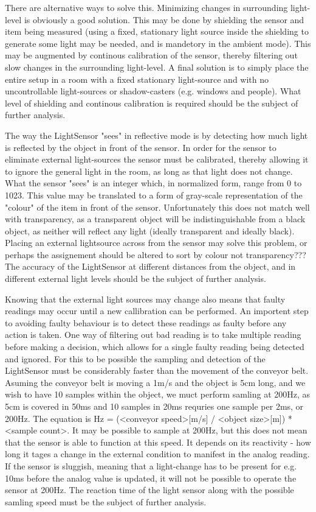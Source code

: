 There are alternative ways to solve this. Minimizing changes in surrounding light-level is obviously a good solution. This may be done by shielding the sensor and item being measured (using a fixed, stationary light source inside the shielding to generate some light may be needed, and is mandetory in the ambient mode). This may be augmented by continous calibration of the sensor, thereby filtering out slow changes in the surrounding light-level. A final solution is to simply place the entire setup in a room with a fixed stationary light-source and with no uncontrollable light-sources or shadow-casters (e.g. windows and people). What level of shielding and continous calibration is required should be the subject of further analysis.

The way the LightSensor "sees" in reflective mode is by detecting how much light is reflected by the object in front of the sensor. In order for the sensor to eliminate external light-sources the sensor must be calibrated, thereby allowing it to ignore the general light in the room, as long as that light does not change. What the sensor "sees" is an integer which, in normalized form, range from 0 to 1023. This value may be translated to a form of gray-scale representation of the "colour" of the item in front of the sensor. Unfortunately this does not match well with transparency, as a transparent object will be indistinguishable from a black object, as neither will reflect any light (ideally transparent and ideally black). Placing an external lightsource across from the sensor may solve this problem, or perhaps the assignement should be altered to sort by colour not transparency??? The accuracy of the LightSensor at different distances from the object, and in different external light levels should be the subject of further analysis.

Knowing that the external light sources may change also means that faulty readings may occur until a new callibration can be performed. An importent step to avoiding faulty behaviour is to detect these readings as faulty before any action is taken. One way of filtering out bad reading is to take multiple reading before making a decision, which allows for a single faulty reading being detected and ignored. For this to be possible the sampling and detection of the LightSensor must be considerably faster than the movement of the conveyor belt. Asuming the conveyor belt is moving a 1m/s and the object is 5cm long, and we wish to have 10 samples within the object, we muct perform samling at 200Hz, as 5cm is covered in 50ms and 10 samples in 20ms requries one sample per 2ms, or 200Hz. The equation is Hz = (<conveyor speed>[m/s] / <object size>[m]) * <sample count>. It may be possible to sample at 200Hz, but this does not mean that the sensor is able to function at this speed. It depends on its reactivity - how long it tages a change in the external condition to manifest in the analog reading. If the sensor is sluggish, meaning that a light-change has to be present for e.g. 10ms before the analog value is updated, it will not be possible to operate the sensor at 200Hz. The reaction time of the light sensor along with the possible samling speed must be the subject of further analysis.

